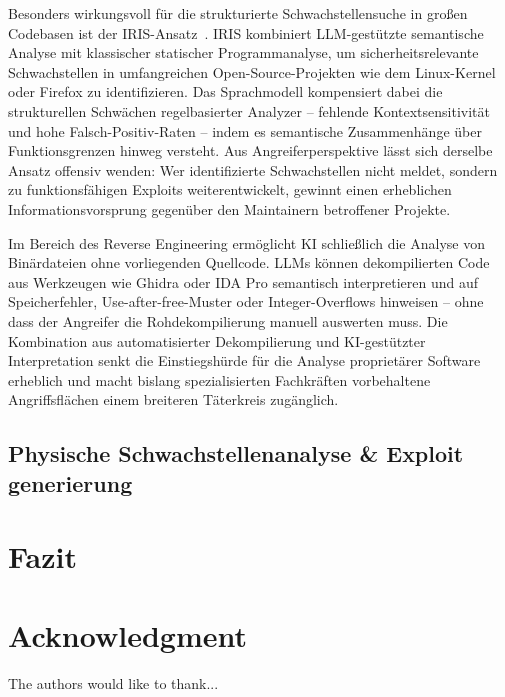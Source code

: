 \documentclass[conference]{IEEEtran}
\begin{document}
Besonders wirkungsvoll für die strukturierte Schwachstellensuche in großen Codebasen ist der IRIS-Ansatz~\cite{li_iris_2024}. IRIS kombiniert LLM-gestützte semantische Analyse mit klassischer statischer Programmanalyse, um sicherheitsrelevante Schwachstellen in umfangreichen Open-Source-Projekten wie dem Linux-Kernel oder Firefox zu identifizieren. Das Sprachmodell kompensiert dabei die strukturellen Schwächen regelbasierter Analyzer -- fehlende Kontextsensitivität und hohe Falsch-Positiv-Raten -- indem es semantische Zusammenhänge über Funktionsgrenzen hinweg versteht. Aus Angreiferperspektive lässt sich derselbe Ansatz offensiv wenden: Wer identifizierte Schwachstellen nicht meldet, sondern zu funktionsfähigen Exploits weiterentwickelt, gewinnt einen erheblichen Informationsvorsprung gegenüber den Maintainern betroffener Projekte.
\newline

Im Bereich des Reverse Engineering ermöglicht KI schließlich die Analyse von Binärdateien ohne vorliegenden Quellcode. LLMs können dekompilierten Code aus Werkzeugen wie Ghidra oder IDA Pro semantisch interpretieren und auf Speicherfehler, Use-after-free-Muster oder Integer-Overflows hinweisen -- ohne dass der Angreifer die Rohdekompilierung manuell auswerten muss. Die Kombination aus automatisierter Dekompilierung und KI-gestützter Interpretation senkt die Einstiegshürde für die Analyse proprietärer Software erheblich und macht bislang spezialisierten Fachkräften vorbehaltene Angriffsflächen einem breiteren Täterkreis zugänglich.

\subsection{Physische Schwachstellenanalyse \& Exploit generierung}

\section{Fazit}





\section*{Acknowledgment}


The authors would like to thank...
\end{document}
